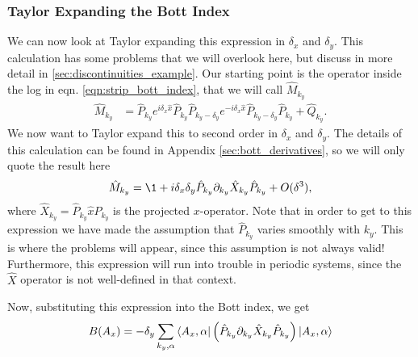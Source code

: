 \subsubsection{Taylor Expanding the Bott Index}
We can now look at Taylor expanding this expression in $\delta_x$ and $\delta_y$. This calculation has some problems that we will overlook here, but discuss in more detail in \textsection\ref{sec:discontinuities_example}. Our starting point is the operator inside the log in eqn. \ref{eqn:strip_bott_index}, that we will call $\hat M_{k_y}$
\begin{align}
	\hat M_{k_y} &= \hat P_{k_y}  e^{i \delta_x \hat x}  \hat P_{k_y} \hat P_{k_y - \delta_y} e^{-i \delta_x \hat x}  \hat P_{k_y - \delta_y} \hat P_{k_y} + \hat Q_{k_y}.
\end{align}
We now want to Taylor expand this to second order in $\delta_x$ and $\delta_y$. The details of this calculation can be found in Appendix \ref{sec:bott_derivatives}, so we will only quote the result here
\begin{align}
	\hat M_{k_y}  = \1 +i \delta_x \delta_y \hat P_{k_y} \partial_{k_y} \hat X_{k_y} \hat P_{k_y} + O(\delta^3),
\end{align}
where $\hat X_{k_y} = \hat P_{k_y} \hat x  \hat P_{k_y} $ is the projected $x$-operator. Note that in order to get to this expression we have made the assumption that $\hat P_{k_y}$ varies smoothly with $k_y$. This is where the problems will appear, since this assumption is not always valid! Furthermore, this expression will run into trouble in periodic systems, since the $\hat X$ operator is not well-defined in that context. \par
Now, substituting this expression into the Bott index, we get
\begin{align} \label{eqn:ryan_bott_expression}
	B( A_x ) =  -\delta_y\sum_{k_y , \alpha}  \bra{ A_x , \alpha} \left (
	\hat P_{k_y} \partial_{k_y} \hat X_{k_y} \hat P_{k_y}
	 \right ) \ket{A_x , \alpha}
\end{align}
 

